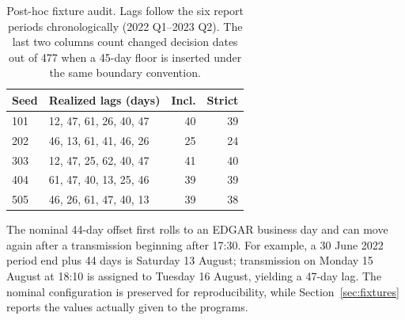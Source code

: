 \documentclass[10pt,twocolumn,a4paper]{article}
\begin{document}
\begin{table}[htbp]
\centering\small
\setlength{\tabcolsep}{3pt}
\begin{tabular}{llrr}
\toprule
Seed & Realized lags (days) & Incl. & Strict\\
\midrule
101 & 12, 47, 61, 26, 40, 47 & 40 & 39\\
202 & 46, 13, 61, 41, 46, 26 & 25 & 24\\
303 & 12, 47, 25, 62, 40, 47 & 41 & 40\\
404 & 61, 47, 40, 13, 25, 46 & 39 & 39\\
505 & 46, 26, 61, 47, 40, 13 & 39 & 38\\
\bottomrule
\end{tabular}
\caption{Post-hoc fixture audit. Lags follow the six report periods chronologically (2022 Q1--2023 Q2). The last two columns count changed decision dates out of 477 when a 45-day floor is inserted under the same boundary convention.}
\label{tab:sensitivity}
\end{table}

The nominal 44-day offset first rolls to an EDGAR business day and can move again after a transmission beginning after 17:30. For example, a 30 June 2022 period end plus 44 days is Saturday 13 August; transmission on Monday 15 August at 18:10 is assigned to Tuesday 16 August, yielding a 47-day lag. The nominal configuration is preserved for reproducibility, while Section~\ref{sec:fixtures} reports the values actually given to the programs.
\end{document}
